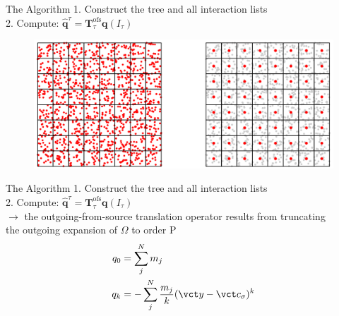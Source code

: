 \begin{frame}{The Algorithm}
  1. Construct the tree and all interaction lists\\
  \vspace{3mm}
  2. Compute: $\hat{\mathbf{q}}^{\tau}=\mathbf{T}_{\tau}^{\mathrm{ofs}} \mathbf{q}\left(I_{\tau}\right)$\\
    \vspace{4mm}
  \begin{figure}[htp]
      \includegraphics[width=21cm]{presentation/img/outgoing1.png}
      \label{fig:particles}
  \end{figure}
\end{frame}

\begin{frame}{The Algorithm}
  1. Construct the tree and all interaction lists\\
  \vspace{3mm}
  2. Compute: $\hat{\mathbf{q}}^{\tau}=\mathbf{T}_{\tau}^{\mathrm{ofs}} \mathbf{q}\left(I_{\tau}\right)$\\
  \vspace{8mm}
  \setlength{\parindent}{4ex}  $\rightarrow$ the outgoing-from-source translation operator results from truncating \\ \setlength{\parindent}{4ex} the outgoing expansion of $\Omega$ to order P
       \begin{equation}
          \begin{split}
            q_0 &= \sum_j^N m_j \\
            q_k &= - \sum_j^N \frac{m_j}{k} (\vct y - \vct c_\sigma)^k
          \end{split}
        \end{equation}
\end{frame}


